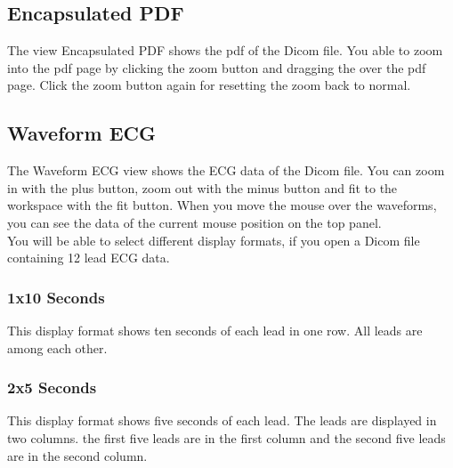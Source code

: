 	\begin{minipage}{\textwidth} 
	\centering
	\label{fig:bild}
	\end{minipage}

	\subsection{Encapsulated PDF}
		The view Encapsulated PDF shows the pdf of the Dicom file. You able to zoom into the pdf page by
		clicking the zoom button and dragging the over the pdf page. Click the zoom button again for 					resetting the zoom back to normal. \\
	
	\begin{minipage}{\textwidth} 
	\centering
	\label{fig:bild}
	\end{minipage}
	
	\subsection{Waveform ECG}
		The Waveform ECG view shows the ECG data of the Dicom file. You can zoom in
		with the plus button, zoom out with the minus button and fit to the workspace with
		the fit button. When you move the mouse over the waveforms, you can see the
		data of the current mouse position on the top panel. \\
		You will be able to select different display formats, if you open a Dicom file containing 12 lead 			ECG data.\\
		
		\begin{minipage}{\textwidth} 
		\centering
		\label{fig:bild}
		\end{minipage}
	
		\subsubsection{1x10 Seconds}
			This display format shows ten seconds of each lead in one row. All leads are
			among each other.
		
		\subsubsection{2x5 Seconds}
			This display format shows five seconds of each lead. The leads are displayed in
			two columns. the first five leads are in the first column and the second five leads
			are in the second column.\\
		

